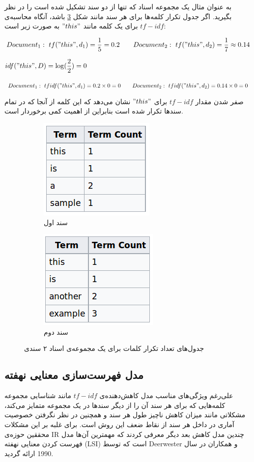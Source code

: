 	به عنوان مثال یک مجموعه اسناد که تنها از دو سند تشکیل شده است را در نظر بگیرید. اگر جدول تکرار کلمه‌ها برای هر سند مانند شکل
	\ref{chap3-fig3}
	باشد، آنگاه محاسبه‌ی
	$tf-idf$
	برای یک کلمه مانند
	$"this"$
	به صورت زیر است:
\begin{flushleft}
$Document_1:\  tf("this",d_1) = \dfrac{1}{5} = 0.2 \qquad Document_2:\  tf("this",d_2) = \dfrac{1}{7} \approx 0.14$

$idf("this",D) = \log(\dfrac{2}{2}) = 0$

$Document_1:\  tfidf("this",d_1) = 0.2 \times 0 = 0 \qquad Document_2:\  tfidf("this",d_2) = 0.14 \times 0 = 0$
\end{flushleft}
صفر شدن مقدار 
$tf-idf$ 
برای 
$"this"$ 
نشان می‌‌دهد که این کلمه از آنجا که در تمام سند‌ها تکرار شده است بنابراین از اهمیت کمی‌ برخوردار است.   
	\begin{figure}[b]
		\centering
		\begin{subfigure}{0.3\textwidth}
			\centering
			\includegraphics[scale=0.4]{chap3-img/tf-idf1}
			\caption{سند اول}
			\label{chap3-fig3-1}
		\end{subfigure}		
		\begin{subfigure}{0.3\textwidth}
			\centering
			\includegraphics[scale=0.4]{chap3-img/tf-idf2}
			\caption{سند دوم}
			\label{chap3-fig3-2}
		\end{subfigure}
		\caption{جدول‌های تعداد تکرار کلمات برای یک مجموعه‌ی اسناد ۲ سندی}
		\label{chap3-fig3}
	\end{figure}
	
	\subsection{مدل فهرست‌سازی معنایی نهفته}
	\label{chap3sec3sub2}
	علی‌رغم ویژگی‌‌های مناسب مدل کاهش‌دهنده‌ی
	$tf-idf$
	مانند شناسایی مجموعه کلمه‌هایی که برای هر سند آن را از دیگر سند‌ها در یک مجموعه متمایز می‌‌کند، مشکلاتی مانند میزان کاهش ناچیز طول هر سند و همچنین در نظر نگرفتن خصوصیت آماری‌ در داخل هر سند از نقاط ضعف این روش است. برای غلبه بر این مشکلات محققین حوزه‌ی
	IR
	چندین مدل کاهش بعد دیگر معرفی‌ کردند که مهمترین آن‌ها مدل فهرست کردن معنایی نهفته
	(LSI)
	است که توسط
	Deerwester \cite{deerwester1990indexing}
	 و همکاران در سال 1990 ارائه گردید.
	
